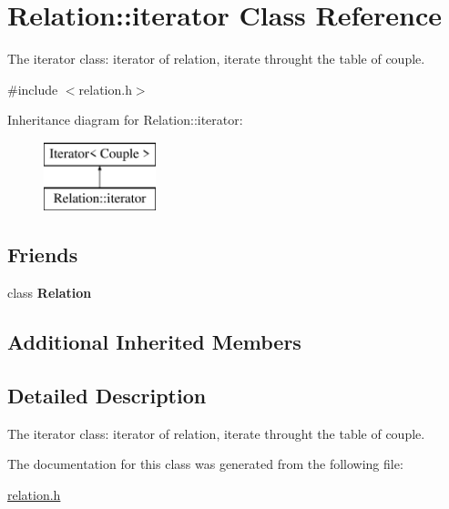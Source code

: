 \hypertarget{class_relation_1_1iterator}{}\section{Relation\+:\+:iterator Class Reference}
\label{class_relation_1_1iterator}


The iterator class\+: iterator of relation, iterate throught the table of couple.  




{\ttfamily \#include $<$relation.\+h$>$}

Inheritance diagram for Relation\+:\+:iterator\+:\begin{figure}[H]
\begin{center}
\leavevmode
\includegraphics[height=2.000000cm]{class_relation_1_1iterator}
\end{center}
\end{figure}
\subsection*{Friends}
\begin{DoxyCompactItemize}
\item 
\mbox{\label{class_relation_1_1iterator_a7ee004262f27f8c916688911a71e3aa1}} 
class {\bfseries Relation}
\end{DoxyCompactItemize}
\subsection*{Additional Inherited Members}


\subsection{Detailed Description}
The iterator class\+: iterator of relation, iterate throught the table of couple. 

The documentation for this class was generated from the following file\+:\begin{DoxyCompactItemize}
\item 
\hyperlink{relation_8h}{relation.\+h}\end{DoxyCompactItemize}
